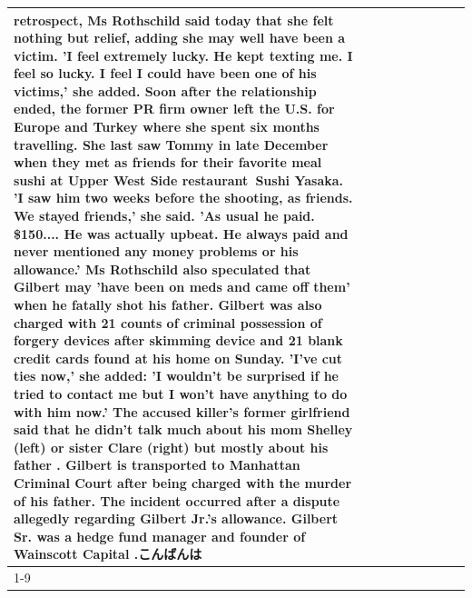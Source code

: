 \begin{table}[H]
\begin{tabular}{lllrlllll}
retrospect, Ms Rothschild said today that she felt nothing but relief, adding she may well have been a victim. 'I feel extremely lucky. He kept texting me. I feel so lucky. I feel I could have been one of his victims,' she added. Soon after the relationship ended, the former PR firm owner left the U.S. for Europe and Turkey where she spent six months  travelling. She last saw Tommy in late December when they met as friends for their favorite meal sushi at Upper West Side restaurant Sushi Yasaka. 'I saw him two weeks before the shooting, as friends. We stayed friends,' she said. 'As usual he paid. \$150.... He was actually upbeat. He always paid and never mentioned any money problems or his allowance.' Ms Rothschild also speculated that Gilbert may 'have been on meds and came off them' when he fatally shot his father. Gilbert was also charged with 21 counts of criminal possession of forgery devices after skimming device and 21 blank credit cards found at his home on Sunday. 'I've cut ties now,' she added: 'I wouldn’t be surprised if he tried to contact me but I won’t have anything to do with him now.' The accused killer's former girlfriend said that he didn't talk much about his mom Shelley (left) or sister Clare (right) but mostly about his father . Gilbert is transported to Manhattan Criminal Court  after being charged with the murder of his father. The incident occurred after a dispute allegedly regarding Gilbert Jr.'s allowance. Gilbert Sr. was a hedge fund manager and founder of Wainscott Capital .こんばんは \\
\cline{1-9} \cline{2-9}

\end{tabular}
\end{table}
